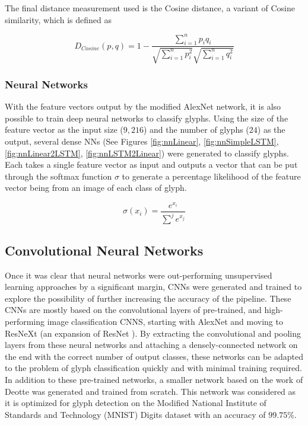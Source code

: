 The final distance measurement used is the Cosine distance, a variant of Cosine similarity, which is defined as

\begin{equation}
  \label{eq:distanceCosine}
  D_{Cosine}(p,q) = 1 - \frac{\sum_{i=1}^{n}p_i q_i}{\sqrt{\sum_{i=1}^{n} p_i^2}\sqrt{\sum_{i=1}^{n} q_i^2}}
\end{equation}

\subsubsection{Neural Networks}

With the feature vectors output by the modified AlexNet network, it is also possible to train deep neural networks to classify glyphs. Using the size of the feature vector as the input size ($9,216$) and the number of glyphs ($24$) as the output, several dense NNs (See Figures \ref{fig:nnLinear}, \ref{fig:nnSimpleLSTM}, \ref{fig:nnLinear2LSTM}, \ref{fig:nnLSTM2Linear}) were generated to classify glyphs. Each takes a single feature vector as input and outputs a vector that can be put through the softmax function $\sigma$  to generate a percentage likelihood of the feature vector being from an image of each class of glyph.

\begin{equation}
  \label{eq:softmax}
  \sigma(x_i)=\frac{e^{x_i}}{\sum^j{e^{x_j}}}
\end{equation}

\subsection{Convolutional Neural Networks}

Once it was clear that neural networks were out-performing unsupervised learning approaches by a significant margin, CNNs were generated and trained to explore the possibility of further increasing the accuracy of the pipeline. These CNNs are mostly based on the convolutional layers of pre-trained, and high-performing image classification CNNS, starting with AlexNet \cite{Krizhevsky} and moving to ResNeXt \cite{Xie} (an expansion of ResNet \cite{He}). By extracting the convolutional and pooling layers from these neural networks and attaching a densely-connected network on the end with the correct number of output classes, these networks can be adapted to the problem of glyph classification quickly and with minimal training required. In addition to these pre-trained networks, a smaller network based on the work of Deotte \cite{Deotte} was generated and trained from scratch. This network was considered as it is optimized for glyph detection on the Modified National Institute of Standards and Technology (MNIST) Digits dataset \cite{Deng} with an accuracy of $99.75\%$.

